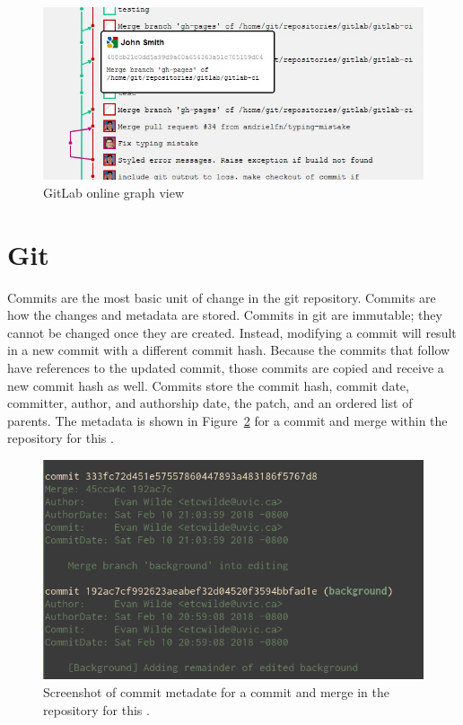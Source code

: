 \begin{figure}[htpb]
  \centering
  \includegraphics[width=0.8\linewidth]{Figures/introduction/gitlab_graph.jpg}
  \caption{GitLab online graph view}
  \label{fig:gitlab_dag_screenshot}
\end{figure}

\section{Git}
\label{sec:git}

Commits are the most basic unit of change in the git repository.
Commits are how the changes and metadata are stored.
Commits in git are immutable; they cannot be changed once they are
created. Instead, modifying a commit will result
in a new commit with a different commit hash.
Because the commits that follow have references to the updated commit,
those commits are copied and receive a new commit hash as well.
Commits store the commit hash, commit date,
committer, author, and authorship date, the patch, and an ordered list
of parents. The metadata is shown in Figure~\ref{fig:commit_metadata}
for a commit and merge within the repository for this \paper{}.

\begin{figure}[htpb]
  \centering
  \includegraphics[width=0.8\linewidth]{Figures/background/commit_metadata.png}
  \caption{Screenshot of commit metadate for a commit and merge in the
    repository for this \paper{}.}
  \label{fig:commit_metadata}
\end{figure}

